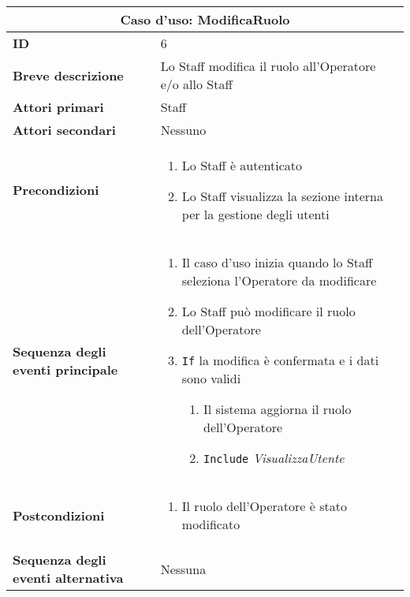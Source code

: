 \documentclass[a4paper]{report}
\begin{document}
\clearpage
\begin{table}[H]
\vspace*{-0cm}
\renewcommand{\arraystretch}{1.9}
\begin{tabular}{|p{3.9cm}|p{9.9cm}|}
\hline
\multicolumn{2}{|c|}{\textbf{Caso d’uso: ModificaRuolo}} \\ \hline
\textbf{ID} & 6 \\ \hline
\textbf{Breve descrizione} & Lo Staff modifica il ruolo all’Operatore e/o allo Staff \\ \hline
\textbf{Attori primari} & Staff \\ \hline
\textbf{Attori secondari} & Nessuno \\ \hline
\textbf{Precondizioni} & \begin{enumerate}[leftmargin=14pt,label=\arabic*.,labelsep=0.5em,topsep=0pt,partopsep=0pt,parsep=0pt,itemsep=0pt]
    \item Lo Staff è autenticato
    \item Lo Staff visualizza la sezione interna per la gestione degli utenti
\end{enumerate} \\ \hline
\textbf{Sequenza degli eventi principale} &
\begin{enumerate}[leftmargin=14pt,label=\arabic*.,labelsep=0.5em,topsep=0pt,partopsep=0pt,parsep=0pt,itemsep=0pt]
    \item Il caso d’uso inizia quando lo Staff seleziona l’Operatore da modificare
    \item Lo Staff può modificare il ruolo dell’Operatore
    \item \texttt{If} la modifica è confermata e i dati sono validi
    \begin{enumerate}[label=\arabic{enumi}.\arabic*.,leftmargin=22pt,labelsep=0.5em,topsep=0pt,partopsep=0pt,parsep=0pt,itemsep=0pt]
        \item Il sistema aggiorna il ruolo dell’Operatore
        \item \texttt{Include} \textit{VisualizzaUtente}
    \end{enumerate}
\end{enumerate}\\ \hline
\textbf{Postcondizioni} & \begin{enumerate}[leftmargin=14pt,label=\arabic*.,labelsep=0.5em,topsep=0pt,partopsep=0pt,parsep=0pt,itemsep=0pt]
    \item Il ruolo dell’Operatore è stato modificato
    \end{enumerate} \\ \hline
\textbf{Sequenza degli eventi alternativa} & Nessuna\\ \hline
\end{tabular}
\end{table}
\end{document}
